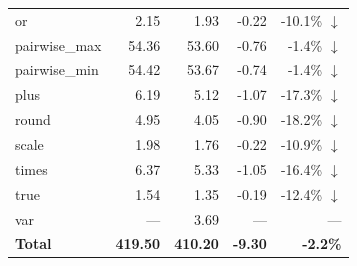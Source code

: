 \begin{table}[H]
\begin{tabular}{l r r r r}
  or & 2.15 & 1.93 & -0.22 & -10.1\% $\downarrow$ \\
  pairwise\_max & 54.36 & 53.60 & -0.76 & -1.4\% $\downarrow$ \\
  pairwise\_min & 54.42 & 53.67 & -0.74 & -1.4\% $\downarrow$ \\
  plus & 6.19 & 5.12 & -1.07 & -17.3\% $\downarrow$ \\
  round & 4.95 & 4.05 & -0.90 & -18.2\% $\downarrow$ \\
  scale & 1.98 & 1.76 & -0.22 & -10.9\% $\downarrow$ \\
  times & 6.37 & 5.33 & -1.05 & -16.4\% $\downarrow$ \\
  true & 1.54 & 1.35 & -0.19 & -12.4\% $\downarrow$ \\
  var & --- & 3.69 & --- & ---  \\
\midrule
  \textbf{Total} & \textbf{419.50} & \textbf{410.20} & \textbf{-9.30} & \textbf{-2.2\%} \\
\bottomrule
\end{tabular}
\end{table}
